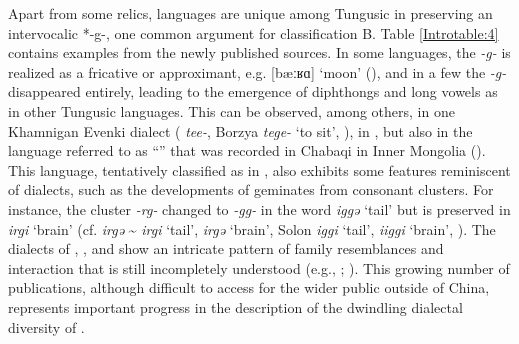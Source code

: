 \documentclass[output=paper,colorlinks,citecolor=brown]{langscibook}
\begin{document}
Apart from some relics,  languages are unique among Tungusic in preserving an intervocalic *-g-, one common argument for classification B. Table \ref{Introtable:4} contains examples from the newly published sources. In some  languages, the \textit{-g-} is realized as a fricative or approximant, e.g.  [bæːʁɑ] ‘moon’ (\citealt{Hasibateer2016}), and in a few the \textit{-g-} disappeared entirely, leading to the emergence of diphthongs and long vowels as in other Tungusic languages. This can be observed, among others, in one Khamnigan Evenki dialect ( \textit{tee-}, Borzya \textit{tege-} ‘to sit’, ), in , but also in the language referred to as “” that was recorded in Chabaqi  in Inner Mongolia (\citealt{ChaokeKalina2017}). This language, tentatively classified as  in , also exhibits some features reminiscent of  dialects, such as the developments of geminates from consonant clusters. For instance, the cluster \textit{-rg-} changed to \textit{-gg-} in the word \textit{iggə} ‘tail’ but is preserved in \textit{irgi} ‘brain’ (cf.  \textit{irgə} {\textasciitilde} \textit{irgi} ‘tail’, \textit{irgə} ‘brain’,  Solon \textit{iggi} ‘tail’, \textit{iiggi} ‘brain’, \citealt{Chaoke2017}). The dialects of , , and  show an intricate pattern of family resemblances and interaction that is still incompletely understood (e.g., \citealt{Whaleyetal1999}; ). This growing number of publications, although difficult to access for the wider public outside of China, represents important progress in the description of the dwindling dialectal diversity of .
\end{document}
